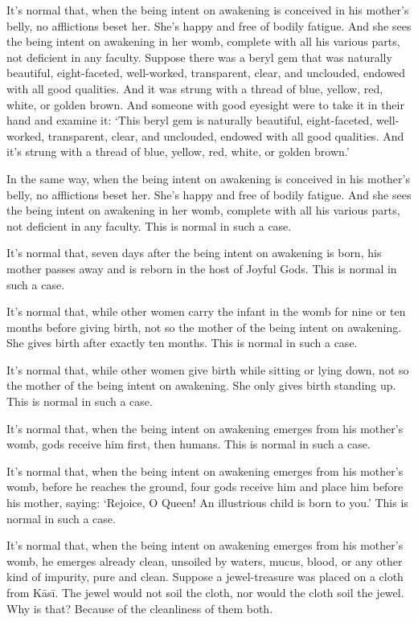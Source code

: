\documentclass[12pt,openany]{book}%
\begin{document}
It’s normal that, when the being intent on awakening is conceived in his mother’s belly, no afflictions beset her. She’s happy and free of bodily fatigue. And she sees the being intent on awakening in her womb, complete with all his various parts, not deficient in any faculty. Suppose there was a beryl gem that was naturally beautiful, eight-faceted, well-worked, transparent, clear, and unclouded, endowed with all good qualities. And it was strung with a thread of blue, yellow, red, white, or golden brown. And someone with good eyesight were to take it in their hand and examine it: ‘This beryl gem is naturally beautiful, eight-faceted, well-worked, transparent, clear, and unclouded, endowed with all good qualities. And it’s strung with a thread of blue, yellow, red, white, or golden brown.’ 

In the same way, when the being intent on awakening is conceived in his mother’s belly, no afflictions beset her. She’s happy and free of bodily fatigue. And she sees the being intent on awakening in her womb, complete with all his various parts, not deficient in any faculty. This is normal in such a case. 

It’s normal that, seven days after the being intent on awakening is born, his mother passes away and is reborn in the host of Joyful Gods. This is normal in such a case. 

It’s normal that, while other women carry the infant in the womb for nine or ten months before giving birth, not so the mother of the being intent on awakening. She gives birth after exactly ten months. This is normal in such a case. 

It’s normal that, while other women give birth while sitting or lying down, not so the mother of the being intent on awakening. She only gives birth standing up. This is normal in such a case. 

It’s normal that, when the being intent on awakening emerges from his mother’s womb, gods receive him first, then humans. This is normal in such a case. 

It’s normal that, when the being intent on awakening emerges from his mother’s womb, before he reaches the ground, four gods receive him and place him before his mother, saying: ‘Rejoice, O Queen! An illustrious child is born to you.’ This is normal in such a case. 

It’s normal that, when the being intent on awakening emerges from his mother’s womb, he emerges already clean, unsoiled by waters, mucus, blood, or any other kind of impurity, pure and clean. Suppose a jewel-treasure was placed on a cloth from \textsanskrit{Kāsī}. The jewel would not soil the cloth, nor would the cloth soil the jewel. Why is that? Because of the cleanliness of them both. 
\end{document}
